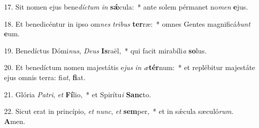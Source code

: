 17. Sit nomen ejus bene\textit{díc}\textit{tum} \textit{in} \textbf{sǽ}cula:~*  ante solem pérmanet no\textit{men} \textbf{e}jus.\

18. Et benedicéntur in ipso om\textit{nes} \textit{tri}\textit{bus} \textbf{ter}ræ:~*  omnes Gentes magnificá\textit{bunt} \textbf{e}um.\

19. Benedíctus Dómi\textit{nus}, \textit{De}\textit{us} \textbf{Is}raël,~*  qui facit mirabíli\textit{a} \textbf{so}lus.\

20. Et benedíctum nomen majestátis e\textit{jus} \textit{in} \textit{æ}\textbf{tér}num:~*  et replébitur majestáte ejus omnis terra: fi\textit{at}, \textbf{fi}at.\

21. Glória \textit{Pa}\textit{tri}, \textit{et} \textbf{Fí}lio,~*  et Spirítu\textit{i} \textbf{Sanc}to.\

22. Sicut erat in princípio, \textit{et} \textit{nunc}, \textit{et} \textbf{sem}per,~*  et in sǽcula sæculó\textit{rum}. \textbf{A}men.\

